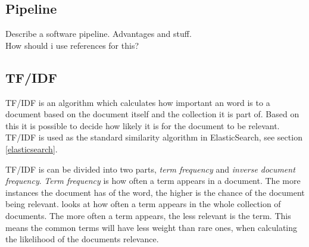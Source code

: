 \subsection{Pipeline} \label{pipeline}
Describe a software pipeline. Advantages and stuff.\\
How should i use references for this?

\subsection{TF/IDF} \label{tf/idf}
TF/IDF is an algorithm which calculates how important an word is to a document based on the document itself and the collection it is part of. Based on this it is possible to decide how likely it is for the document to be relevant. TF/IDF is used as the standard similarity algorithm in ElasticSearch, see section \ref{elasticsearch}.

TF/IDF is can be divided into two parts, \textit{term frequency} and \textit{inverse document frequency}. \textit{Term frequency} is how often a term appears in a document. The more instances the document has of the word, the higher is the chance of the document being relevant.  looks at how often a term appears in the whole collection of documents. The more often a term appears, the less relevant is the term. This means the common terms will have less weight than rare ones, when calculating the likelihood of the documents relevance. 

\cleardoublepage